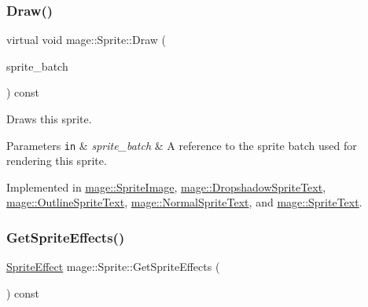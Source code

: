 \hypertarget{classmage_1_1_sprite_a954a9f2046edcd6b1658a236ae23ec5a}{}\label{classmage_1_1_sprite_a954a9f2046edcd6b1658a236ae23ec5a} 
\subsubsection{\texorpdfstring{Draw()}{Draw()}}
{\footnotesize\ttfamily virtual void mage\+::\+Sprite\+::\+Draw (\begin{DoxyParamCaption}\item[{\hyperlink{classmage_1_1_sprite_batch}{Sprite\+Batch} \&}]{sprite\+\_\+batch }\end{DoxyParamCaption}) const\hspace{0.3cm}{\ttfamily [pure virtual]}}

Draws this sprite.


\begin{DoxyParams}[1]{Parameters}
\mbox{\tt in}  & {\em sprite\+\_\+batch} & A reference to the sprite batch used for rendering this sprite. \\
\hline
\end{DoxyParams}


Implemented in \hyperlink{classmage_1_1_sprite_image_ae30d3293931f674fea17008063755bb6}{mage\+::\+Sprite\+Image}, \hyperlink{classmage_1_1_dropshadow_sprite_text_af76422c9812d7dc38e9b98e587103c67}{mage\+::\+Dropshadow\+Sprite\+Text}, \hyperlink{classmage_1_1_outline_sprite_text_a524e9ad1caeeeaa32405e61d1a5e1032}{mage\+::\+Outline\+Sprite\+Text}, \hyperlink{classmage_1_1_normal_sprite_text_ad2a1b02bea18afd6bf61b106a727a355}{mage\+::\+Normal\+Sprite\+Text}, and \hyperlink{classmage_1_1_sprite_text_a45d5ac8410d5a46b26e8491946a2ad9e}{mage\+::\+Sprite\+Text}.

\hypertarget{classmage_1_1_sprite_a1a969b7cf3f1892894710a80582b4cd2}{}\label{classmage_1_1_sprite_a1a969b7cf3f1892894710a80582b4cd2} 
\subsubsection{\texorpdfstring{Get\+Sprite\+Effects()}{GetSpriteEffects()}}
{\footnotesize\ttfamily \hyperlink{namespacemage_a9cfe18123066ba4236f548f9de75d881}{Sprite\+Effect} mage\+::\+Sprite\+::\+Get\+Sprite\+Effects (\begin{DoxyParamCaption}{ }\end{DoxyParamCaption}) const\hspace{0.3cm}{\ttfamily [noexcept]}}

